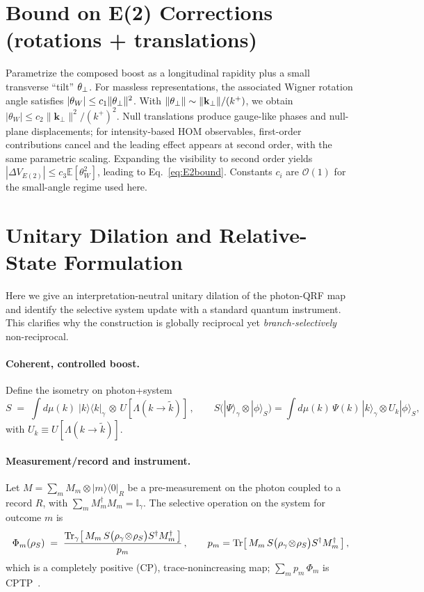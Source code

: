\documentclass[aps,11pt]{article}
\providecommand{\bra}[1]{\langle #1|}
\providecommand{\ket}[1]{|#1\rangle}
\newcommand{\E}{\mathbb{E}}
\newcommand{\kplus}{k^{+}}
\newcommand{\kperp}{\mathbf{k}_{\perp}}
\begin{document}
\section{Bound on E(2) Corrections (rotations + translations)}\label{app:E2bound}
Parametrize the composed boost as a longitudinal rapidity plus a small transverse ``tilt'' \(\vb{\theta}_\perp\). For massless representations, the associated Wigner rotation angle satisfies \(|\theta_W|\le c_1 \|\vb{\theta}_\perp\|^{2}\). With \(\|\vb{\theta}_\perp\|\sim \|\kperp\|/(\kplus)\), we obtain \(|\theta_W|\le c_2 \|\kperp\|^{2}/(\kplus)^{2}\).
Null translations produce gauge-like phases and null-plane displacements; for intensity-based HOM observables, first-order contributions cancel and the leading effect appears at second order, with the same parametric scaling. Expanding the visibility to second order yields
\(|\Delta V_{E(2)}|\le c_3 \E[\theta_W^{2}]\), leading to Eq.~\eqref{eq:E2bound}. Constants \(c_i\) are \(\mathcal O(1)\) for the small-angle regime used here.

\section{Unitary Dilation and Relative-State Formulation}\label{app:F}
Here we give an interpretation-neutral unitary dilation of the photon-QRF map and identify the selective system update with a standard quantum instrument. This clarifies why the construction is globally reciprocal yet \emph{branch-selectively} non-reciprocal.

\paragraph{Coherent, controlled boost.}
Define the isometry on photon+system
\begin{equation}
S \;=\; \int d\mu(k)\;\ket{k}\!\bra{k}_\gamma \,\otimes\, U[\Lambda(k\!\to\!\tilde k)]\,,
\qquad
S\big(\ket{\Psi}_\gamma\!\otimes\!\ket{\phi}_S\big)=\int d\mu(k)\,\Psi(k)\,\ket{k}_\gamma\otimes U_k\ket{\phi}_S,
\end{equation}
with \(U_k\equiv U[\Lambda(k\!\to\!\tilde k)]\).

\paragraph{Measurement/record and instrument.}
Let \(M=\sum_m M_m\otimes\ket{m}\!\bra{0}_R\) be a pre-measurement on the photon coupled to a record \(R\), with \(\sum_m M_m^\dagger M_m=\mathbb I_\gamma\). The selective operation on the system for outcome \(m\) is
\begin{equation}\label{eq:instrument}
\Phi_m(\rho_S)\;=\;\frac{\Tr_{\gamma}\!\left[\,M_m\,S\big(\rho_\gamma\!\otimes\!\rho_S\big)S^\dagger M_m^\dagger\,\right]}{p_m}\,,\qquad
p_m=\Tr\!\left[\,M_m\,S\big(\rho_\gamma\!\otimes\!\rho_S\big)S^\dagger M_m^\dagger\,\right],
\end{equation}
which is a completely positive (CP), trace-nonincreasing map; \(\sum_m p_m\,\Phi_m\) is CPTP~\cite{Stinespring1955,DaviesLewis1970,Ozawa1984}.
\end{document}
